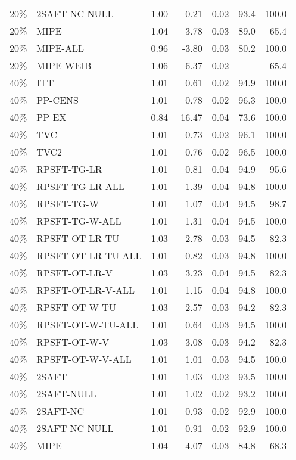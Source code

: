 \begin{table}[ht]
{\begin{tabular}{llrrrrr}
  20\% & 2SAFT-NC-NULL & 1.00 & 0.21 & 0.02 & 93.4 & 100.0 \\ 
  20\% & MIPE & 1.04 & 3.78 & 0.03 & 89.0 & 65.4 \\ 
  20\% & MIPE-ALL & 0.96 & -3.80 & 0.03 & 80.2 & 100.0 \\ 
  20\% & MIPE-WEIB & 1.06 & 6.37 & 0.02 &  & 65.4 \\ 
   \hline
40\% & ITT & 1.01 & 0.61 & 0.02 & 94.9 & 100.0 \\ 
  40\% & PP-CENS & 1.01 & 0.78 & 0.02 & 96.3 & 100.0 \\ 
  40\% & PP-EX & 0.84 & -16.47 & 0.04 & 73.6 & 100.0 \\ 
  40\% & TVC & 1.01 & 0.73 & 0.02 & 96.1 & 100.0 \\ 
  40\% & TVC2 & 1.01 & 0.76 & 0.02 & 96.5 & 100.0 \\ 
   \hline
40\% & RPSFT-TG-LR & 1.01 & 0.81 & 0.04 & 94.9 & 95.6 \\ 
  40\% & RPSFT-TG-LR-ALL & 1.01 & 1.39 & 0.04 & 94.8 & 100.0 \\ 
  40\% & RPSFT-TG-W & 1.01 & 1.07 & 0.04 & 94.5 & 98.7 \\ 
  40\% & RPSFT-TG-W-ALL & 1.01 & 1.31 & 0.04 & 94.5 & 100.0 \\ 
  40\% & RPSFT-OT-LR-TU & 1.03 & 2.78 & 0.03 & 94.5 & 82.3 \\ 
  40\% & RPSFT-OT-LR-TU-ALL & 1.01 & 0.82 & 0.03 & 94.8 & 100.0 \\ 
  40\% & RPSFT-OT-LR-V & 1.03 & 3.23 & 0.04 & 94.5 & 82.3 \\ 
  40\% & RPSFT-OT-LR-V-ALL & 1.01 & 1.15 & 0.04 & 94.8 & 100.0 \\ 
   \hline
40\% & RPSFT-OT-W-TU & 1.03 & 2.57 & 0.03 & 94.2 & 82.3 \\ 
  40\% & RPSFT-OT-W-TU-ALL & 1.01 & 0.64 & 0.03 & 94.5 & 100.0 \\ 
  40\% & RPSFT-OT-W-V & 1.03 & 3.08 & 0.03 & 94.2 & 82.3 \\ 
  40\% & RPSFT-OT-W-V-ALL & 1.01 & 1.01 & 0.03 & 94.5 & 100.0 \\ 
   \hline
40\% & 2SAFT & 1.01 & 1.03 & 0.02 & 93.5 & 100.0 \\ 
  40\% & 2SAFT-NULL & 1.01 & 1.02 & 0.02 & 93.2 & 100.0 \\ 
  40\% & 2SAFT-NC & 1.01 & 0.93 & 0.02 & 92.9 & 100.0 \\ 
  40\% & 2SAFT-NC-NULL & 1.01 & 0.91 & 0.02 & 92.9 & 100.0 \\ 
  40\% & MIPE & 1.04 & 4.07 & 0.03 & 84.8 & 68.3 \\ 

\end{tabular}}
\end{table}
